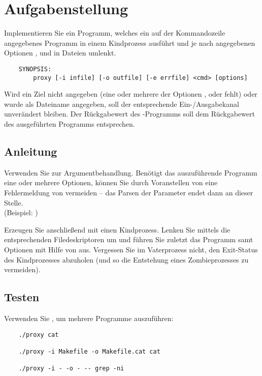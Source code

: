 




\section*{Aufgabenstellung}

Implementieren Sie ein Programm, welches ein auf der Kommandozeile angegebenes
Programm in einem Kindprozess ausführt und je nach angegebenen Optionen
,  und  in Dateien umlenkt.

\begin{verbatim}
    SYNOPSIS:
        proxy [-i infile] [-o outfile] [-e errfile] <cmd> [options]
\end{verbatim}

Wird ein Ziel nicht angegeben (eine oder mehrere der Optionen ,
 oder  fehlt) oder wurde \osuearg{-} als Dateiname
angegeben, soll der entsprechende Ein-/Ausgabekanal unverändert bleiben. Der
Rückgabewert des -Programms soll dem Rückgabewert des
ausgeführten Programms entsprechen.

\subsection*{Anleitung}

Verwenden Sie  zur Argumentbehandlung. Benötigt das
auszuführende Programm eine oder mehrere Optionen, können Sie durch Voranstellen
von \osuearg{--} eine Fehlermeldung von  vermeiden -- das
Parsen der Parameter endet dann an dieser Stelle.\\
(Beispiel: )

Erzeugen Sie anschließend mit  einen Kindprozess. Lenken Sie
mittels  die entsprechenden Filedeskriptoren um und führen Sie
zuletzt das Programm samt Optionen mit Hilfe von  aus.
Vergessen Sie im Vaterprozess nicht, den Exit-Status des Kindprozesses abzuholen
(und so die Entstehung eines Zombieprozesses zu vermeiden).

\subsection*{Testen}

Verwenden Sie , um mehrere Programme auszuführen:

\begin{verbatim}
	./proxy cat

	./proxy -i Makefile -o Makefile.cat cat

	./proxy -i - -o - -- grep -ni
\end{verbatim}

\osueguidelinestwo


